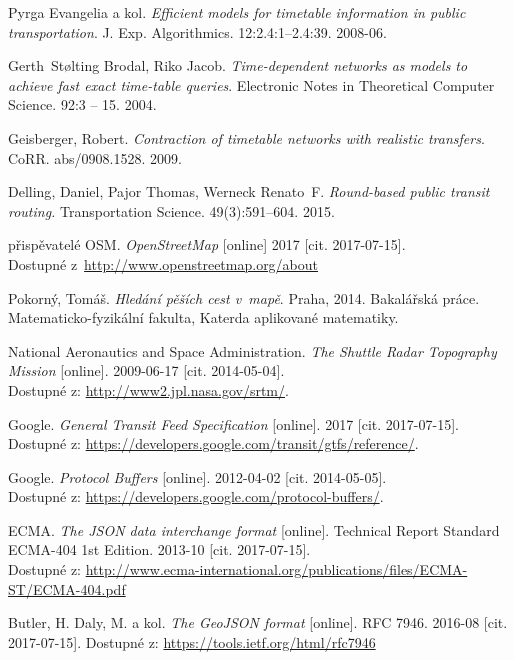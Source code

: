 \begin{thebibliography}{10}

	{\sc Pyrga} Evangelia a kol.
	\emph{Efficient models for timetable information in public
	transportation}.
	J. Exp. Algorithmics. 12:2.4:1--2.4:39. 2008-06.

	{\sc Gerth~Stølting} Brodal, {\sc Riko} Jacob.
	\emph{Time-dependent networks as models to achieve fast exact
	time-table queries}. 
	Electronic Notes in Theoretical Computer Science.
	92:3 -- 15. 2004.

	{\sc Geisberger}, Robert.
	\emph{Contraction of timetable networks with realistic transfers}.
	CoRR.
	abs/0908.1528. 2009.

	{\sc Delling}, Daniel, {\sc Pajor} Thomas, {\sc Werneck} Renato~F.
	\emph{Round-based public transit routing.}
	Transportation Science.
	49(3):591--604. 2015.

	{\sc přispěvatelé OSM}.
	\emph{OpenStreetMap} [online]
	2017 [cit. 2017-07-15].\\
	Dostupné z~\url{http://www.openstreetmap.org/about}

	{\sc Pokorný}, Tomáš.
	\emph{Hledání pěších cest v~mapě}.
	Praha, 
	2014.
	Bakalářská práce. Matematicko-fyzikální fakulta, Katerda aplikované
	matematiky.

	{\sc National Aeronautics and Space Administration.}
	\emph{The Shuttle Radar Topography Mission} [online]. 
	2009-06-17 [cit. 2014-05-04]. \\
	Dostupné z: \url{http://www2.jpl.nasa.gov/srtm/}.

	{\sc Google.}
	\emph{General Transit Feed Specification} [online]. 
	2017 [cit. 2017-07-15]. \\
	Dostupné z: \url{https://developers.google.com/transit/gtfs/reference/}.

	{\sc Google.}
	\emph{Protocol Buffers} [online]. 
	2012-04-02 [cit. 2014-05-05]. \\
	Dostupné z: \url{https://developers.google.com/protocol-buffers/}.

	{\sc ECMA}.
	\emph{The {JSON} data interchange format} [online].
	Technical Report Standard ECMA-404 1st Edition.
	2013-10 [cit. 2017-07-15].\\
	Dostupné z:
	\url{http://www.ecma-international.org/publications/files/ECMA-ST/ECMA-404.pdf}

	{\sc Butler}, H. {\sc Daly}, M. a kol.
	\emph{The GeoJSON format} [online].
	RFC 7946.
	2016-08 [cit. 2017-07-15].
	Dostupné z: \url{https://tools.ietf.org/html/rfc7946}


\end{thebibliography}
